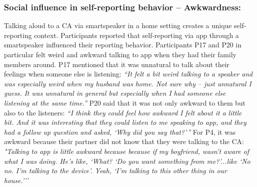     \subsubsection{Social influence in self-reporting behavior -- Awkwardness:}        
        Talking aloud to a \ac{CA} via smartspeaker in a home setting creates a unique self-reporting context. 
        Participants reported that self-reporting via \acl{app} through a smartspeaker influenced their reporting behavior.
        Participants P17 and P20 in particular felt weird and awkward talking to \acl{app} when they had their family members around.
        P17 mentioned that it was unnatural to talk about their feelings when someone else is listening:
            \textit{``It felt a bit weird talking to a speaker and was especially weird when my husband was home. Not sure why – just unnatural I guess.
            It was unnatural in general but especially when I had someone else listening at the same time.''}
        P20 said that it was not only awkward to them but also to the listeners:
            \textit{``I think they could feel how awkward I felt about it a little bit. And it was interesting that they could listen to me speaking to \acl{app}, and they had a follow up question and asked, `Why did you say that?'''}
        For P4, it was awkward because their partner did not know that they were talking to the \ac{CA}:
			\textit{"Talking to \acl{app} is little awkward because because if my boyfriend, wasn't aware of what I was doing. He's like, `What? `Do you want something from me?'...like `No no. I'm talking to the device'. Yeah, `I'm talking to this other thing in our house.'''}

